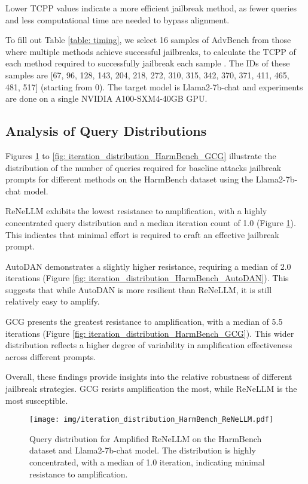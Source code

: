 Lower TCPP values indicate a more efficient jailbreak method, as fewer queries and less computational time are needed to bypass alignment.


To fill out Table \ref{table: timing}, we select 16 samples of AdvBench from those where multiple methods achieve successful jailbreaks, to calculate the TCPP of each method required to successfully jailbreak each sample \cite{ding2023wolf}. The IDs of these samples are [67, 96, 128, 143, 204, 218,
272, 310, 315, 342, 370, 371, 411, 465, 481, 517] (starting from 0). The target model is Llama2-7b-chat and experiments are done on a single NVIDIA A100-SXM4-40GB GPU.


\subsection{Analysis of Query Distributions}

Figures \ref{fig: iteration_distribution_HarmBench_ReNeLLM} to \ref{fig: iteration_distribution_HarmBench_GCG} illustrate the distribution of the number of queries required for baseline attacks jailbreak prompts for different methods on the HarmBench dataset using the Llama2-7b-chat model.

ReNeLLM exhibits the lowest resistance to amplification, with a highly concentrated query distribution and a median iteration count of 1.0 (Figure \ref{fig: iteration_distribution_HarmBench_ReNeLLM}). This indicates that minimal effort is required to craft an effective jailbreak prompt.

AutoDAN demonstrates a slightly higher resistance, requiring a median of 2.0 iterations (Figure \ref{fig: iteration_distribution_HarmBench_AutoDAN}). This suggests that while AutoDAN is more resilient than ReNeLLM, it is still relatively easy to amplify.

GCG presents the greatest resistance to amplification, with a median of 5.5 iterations (Figure \ref{fig: iteration_distribution_HarmBench_GCG}). This wider distribution reflects a higher degree of variability in amplification effectiveness across different prompts.

Overall, these findings provide insights into the relative robustness of different jailbreak strategies. GCG resists amplification the most, while ReNeLLM is the most susceptible.

\begin{figure}[h]
    \centering
    \texttt{[image: img/iteration\_distribution\_HarmBench\_ReNeLLM.pdf]}
    \caption{Query distribution for Amplified ReNeLLM on the HarmBench dataset and Llama2-7b-chat model. The distribution is highly concentrated, with a median of 1.0 iteration, indicating minimal resistance to amplification.}
    \label{fig: iteration_distribution_HarmBench_ReNeLLM}
\end{figure}



